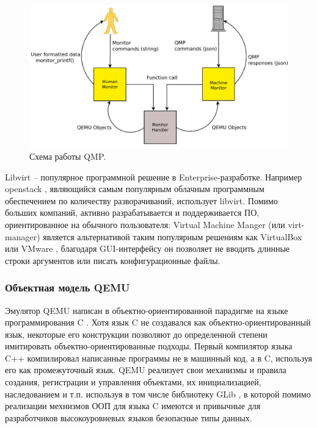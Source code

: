 \begin{figure}[!htbp]
    \centering
    \begin{adjustbox}{max totalsize={0.8\textwidth}{\textheight}}
        \includegraphics[]{images/qmp.png}
    \end{adjustbox}
    \caption{Схема работы QMP.}\label{fig:qmp}
\end{figure}

Libvirt -- популярное программной решение в Enterprise-разработке. Например openstack \cite{openstack}, являющийся
самым популярным облачным программным обеспечением по количеству разворачиваний, использует libvirt.
Помимо больших компаний, активно разрабатывается и поддерживается ПО, ориентированное на обычного пользователя:
Virtual Machine Manger (или virt-manager) является альтернативой таким популярным решениям как VirtualBox \cite{virtualbox} или
VMware \cite{vmware}, благодаря GUI-интерфейсу он позволяет не вводить длинные строки аргументов или писать
конфигурационные файлы.

\subsubsection{Объектная модель QEMU}\label{sec:ch1/sec4/sub3/sub3}

Эмулятор QEMU написан в объектно-ориентированной парадигме на языке программирования C \cite{ooc}.
Хотя язык C не создавался как объектно-ориентированный язык, некоторые его конструкции позволяют
до определенной степени имитировать объектно-ориентированные подходы.
Первый компилятор языка C++ компилировал написанные программы не в машинный код, а в C, используя
его как промежуточный язык.
QEMU реализует свои механизмы и правила создания, регистрации и управления объектами, их инициализацией,
наследованием и т.п. используя в том числе библиотеку GLib \cite{glib}, в которой помимо реализации
мехнизмов ООП для языка C имеются и привычные для разработчиков высокоуровневых языков безопасные типы данных.

